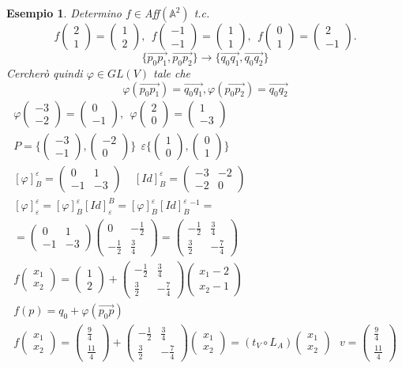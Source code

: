 \documentclass[12px]{article}
\theoremstyle{break}
\theoremstyle{break}
\theoremstyle{break}
\theoremstyle{break}
\theoremstyle{break}
\theoremstyle{break}
\theoremstyle{break}
\newtheorem*{es}{Esempio}
\newcommand{\icol}[1]{%
  \left(\begin{smallmatrix}#1\end{smallmatrix}\right)%
}
\begin{document}
	\begin{es}
		Determino $f\in$Aff$( \mathbb{A} ^2)$ t.c.
		\[
			f\icol{2\\1} = \icol{1\\2},\ \  f\icol{-1\\-1}=\icol{1\\1}, \ \ f\icol{0\\1} = \icol{2\\-1}
		.\] \[
	\{\overrightarrow{p_0p_1},\overrightarrow{p_0p_2}\}  \rightarrow \{\overrightarrow{q_0q_1},\overrightarrow{q_0q_2}\} \]
	Cercherò quindi $\varphi\in GL(V)$ tale che \[\varphi(\overrightarrow{p_0p_1})=\overrightarrow{q_0q_1},\varphi(\overrightarrow{p_0p_2})=\overrightarrow{q_0q_2}\]
\begin{gather*}
	\varphi\icol{-3\\-2}=\icol{0\\-1}, \ \ \varphi\icol{2\\0} = \icol{1\\-3}\\
	P = \{\icol{-3\\-1},\icol{-2\\0}\} \ \ \varepsilon\{\icol{1\\0},\icol{0\\1}\} \\
	[\varphi]_B^\varepsilon = \icol{ 0 & 1 \\ -1 & -3}\ \ \ \ \ [Id]^\varepsilon_B = \icol{-3 & -2\\-2 & 0}\\
	[\varphi]^\varepsilon_ \varepsilon = [\varphi]^\varepsilon_B[Id]^B_ \varepsilon = [\varphi]_B^\varepsilon[Id]^\varepsilon_B^{-1}=\\
	=\icol{0 & 1 \\-1& -3}\icol{0 & -\frac{1}{2} \\ -\frac{1}{2} & \frac{3}{4}} =\icol{-\frac{1}{2} & \frac{3}{4} \\ \frac{3}{2} & -\frac{7}{4}} \\
	f\icol{x_1\\x_2} = \icol{1\\2} + \icol{-\frac{1}{2} & \frac{3}{4} \\ \frac{3}{2} & -\frac{7}{4}}\icol{x_1-2\\x_2-1} \\
	f(p) = q_0 + \varphi(\overrightarrow{p_0p}) \\
	f\icol{x_1\\x_2}=\icol{\frac{9}{4}\\\frac{11}{4}} + \icol{-\frac{1}{2} & \frac{3}{4} \\ \frac{3}{2} & -\frac{7}{4}}\icol{x_1\\x_2} = (t_V\circ L_A)\icol{x_1\\x_2} \ \ \ v = \icol{\frac{9}{4} \\ \frac{11}{4}} 
\end{gather*}
\end{es}
\end{document}
